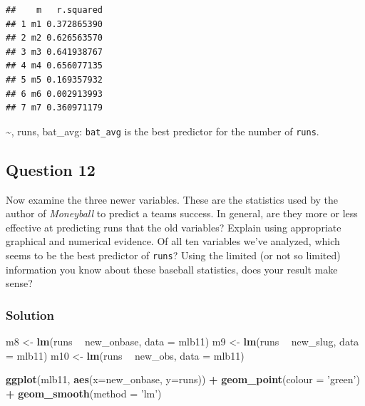 \documentclass[]{article}
\newenvironment{Shaded}{\begin{snugshade}}{\end{snugshade}}
\newcommand{\KeywordTok}[1]{\textcolor[rgb]{0.13,0.29,0.53}{\textbf{#1}}}
\newcommand{\DataTypeTok}[1]{\textcolor[rgb]{0.13,0.29,0.53}{#1}}
\newcommand{\StringTok}[1]{\textcolor[rgb]{0.31,0.60,0.02}{#1}}
\newcommand{\OperatorTok}[1]{\textcolor[rgb]{0.81,0.36,0.00}{\textbf{#1}}}
\newcommand{\NormalTok}[1]{#1}
\begin{document}
\begin{verbatim}
##    m   r.squared
## 1 m1 0.372865390
## 2 m2 0.626563570
## 3 m3 0.641938767
## 4 m4 0.656077135
## 5 m5 0.169357932
## 6 m6 0.002913993
## 7 m7 0.360971179
\end{verbatim}

\textasciitilde{}, runs, bat\_avg: \texttt{bat\_avg} is the best
predictor for the number of \texttt{runs}.

\subsection{Question 12}\label{question-12}

Now examine the three newer variables. These are the statistics used by
the author of \emph{Moneyball} to predict a teams success. In general,
are they more or less effective at predicting runs that the old
variables? Explain using appropriate graphical and numerical evidence.
Of all ten variables we've analyzed, which seems to be the best
predictor of \texttt{runs}? Using the limited (or not so limited)
information you know about these baseball statistics, does your result
make sense?

\subsubsection{Solution}\label{solution-11}

\begin{Shaded}
\begin{Highlighting}[]
\NormalTok{m8 <-}\StringTok{ }\KeywordTok{lm}\NormalTok{(runs }\OperatorTok{~}\StringTok{ }\NormalTok{new_onbase, }\DataTypeTok{data =}\NormalTok{ mlb11)}
\NormalTok{m9 <-}\StringTok{ }\KeywordTok{lm}\NormalTok{(runs }\OperatorTok{~}\StringTok{ }\NormalTok{new_slug, }\DataTypeTok{data =}\NormalTok{ mlb11)}
\NormalTok{m10 <-}\StringTok{ }\KeywordTok{lm}\NormalTok{(runs }\OperatorTok{~}\StringTok{ }\NormalTok{new_obs, }\DataTypeTok{data =}\NormalTok{ mlb11)}

\KeywordTok{ggplot}\NormalTok{(mlb11, }\KeywordTok{aes}\NormalTok{(}\DataTypeTok{x=}\NormalTok{new_onbase, }\DataTypeTok{y=}\NormalTok{runs)) }\OperatorTok{+}
\StringTok{  }\KeywordTok{geom_point}\NormalTok{(}\DataTypeTok{colour =} \StringTok{'green'}\NormalTok{) }\OperatorTok{+}
\StringTok{  }\KeywordTok{geom_smooth}\NormalTok{(}\DataTypeTok{method =} \StringTok{'lm'}\NormalTok{)}
\end{Highlighting}
\end{Shaded}
\end{document}
